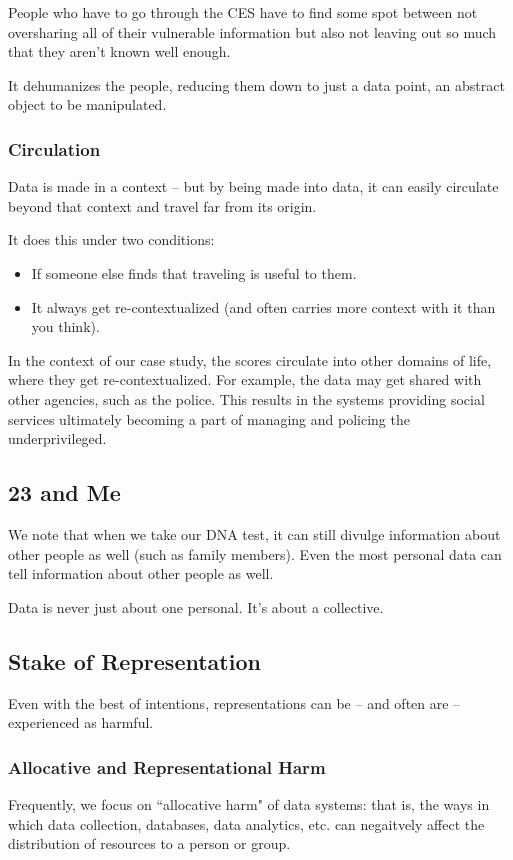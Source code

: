 \documentclass[openany]{book}
\begin{document}
People who have to go through the CES have to find some spot between not oversharing all of their vulnerable information but also not leaving out so much that they aren't known well enough.

It dehumanizes the people, reducing them down to just a data point, an abstract object to be manipulated.

\subsubsection{Circulation}
Data is made in a context -- but by being made into data, it can easily circulate beyond that context and travel far from its origin.

It does this under two conditions:
\begin{itemize}
	\item If someone else finds that traveling is useful to them.
	\item It always get re-contextualized (and often carries more context with it than you think).
\end{itemize}

In the context of our case study, the scores circulate into other domains of life, where they get re-contextualized. For example, the data may get shared with other agencies, such as the police. This results in the systems providing social services ultimately becoming a part of managing and policing the underprivileged.

\subsection{23 and Me}
We note that when we take our DNA test, it can still divulge information about other people as well (such as family members). Even the most personal data can tell information about other people as well.

Data is never just about one personal. It's about a collective.

\subsection{Stake of Representation}
Even with the best of intentions, representations can be -- and often are -- experienced as harmful.

\subsubsection{Allocative and Representational Harm}
Frequently, we focus on ``allocative harm" of data systems: that is, the ways in which data collection, databases, data analytics, etc. can negaitvely affect the distribution of resources to a person or group.
\end{document}
